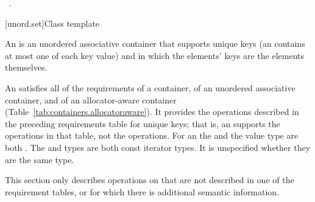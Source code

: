 \documentclass[american,twoside]{book}
\begin{document}
\begin{itemdescr}
\pnum\effects\ .
\end{itemdescr}

[unord.set]{Class template }
%

\pnum
{}%
%
An  is an unordered associative container that
supports unique keys (an  contains at most one of each
key value) and in which the elements' keys are the elements
themselves.

\pnum
An  satisfies all of the requirements of a container, of an unordered associative container, and of an allocator-aware container (Table~\ref{tab:containers.allocatoraware}). It provides the operations described in the preceding requirements table for unique keys; that is, an  supports the  operations in that table, not the  operations. For an  the  and the value type are both . The  and  types are both const iterator types. It is unspecified whether they are the same type.

\pnum
This section only describes operations on  that
are not described in one of the requirement tables, or for which there
is additional semantic information.
\end{document}
